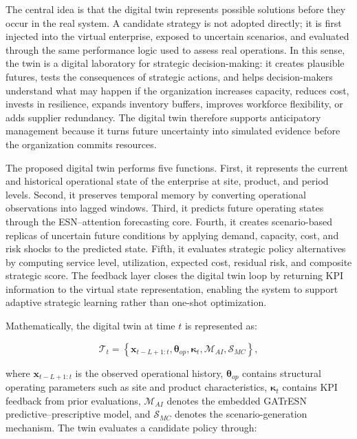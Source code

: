 \documentclass[apajournal,article,submit,pdftex,moreauthors]{Definitions/mdpi}
\begin{document}
The central idea is that the digital twin represents possible solutions before they occur in the real system. A candidate strategy is not adopted directly; it is first injected into the virtual enterprise, exposed to uncertain scenarios, and evaluated through the same performance logic used to assess real operations. In this sense, the twin is a digital laboratory for strategic decision-making: it creates plausible futures, tests the consequences of strategic actions, and helps decision-makers understand what may happen if the organization increases capacity, reduces cost, invests in resilience, expands inventory buffers, improves workforce flexibility, or adds supplier redundancy. The digital twin therefore supports anticipatory management because it turns future uncertainty into simulated evidence before the organization commits resources.

The proposed digital twin performs five functions. First, it represents the current and historical operational state of the enterprise at site, product, and period levels. Second, it preserves temporal memory by converting operational observations into lagged windows. Third, it predicts future operating states through the ESN--attention forecasting core. Fourth, it creates scenario-based replicas of uncertain future conditions by applying demand, capacity, cost, and risk shocks to the predicted state. Fifth, it evaluates strategic policy alternatives by computing service level, utilization, expected cost, residual risk, and composite strategic score. The feedback layer closes the digital twin loop by returning KPI information to the virtual state representation, enabling the system to support adaptive strategic learning rather than one-shot optimization.

Mathematically, the digital twin at time $t$ is represented as:

\begin{linenomath}
\begin{equation}
\mathcal{T}_t
=
\left\{
\mathbf{x}_{t-L+1:t},
\boldsymbol{\theta}_{op},
\boldsymbol{\kappa}_{t},
\mathcal{M}_{AI},
\mathcal{S}_{MC}
\right\},
\label{eq:digital_twin_state}
\end{equation}
\end{linenomath}
where $\mathbf{x}_{t-L+1:t}$ is the observed operational history, $\boldsymbol{\theta}_{op}$ contains structural operating parameters such as site and product characteristics, $\boldsymbol{\kappa}_{t}$ contains KPI feedback from prior evaluations, $\mathcal{M}_{AI}$ denotes the embedded GATrESN predictive--prescriptive model, and $\mathcal{S}_{MC}$ denotes the scenario-generation mechanism. The twin evaluates a candidate policy through:
\end{document}
